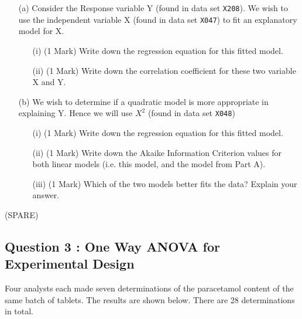 \documentclass[a4paper,12pt]{article}
\begin{document}
\begin{itemize}
	\item[(a)] Consider the Response variable Y (found in data set \texttt{X208}). We wish to use the independent variable X (found in data set \texttt{X047}) to fit an explanatory model for X.
	\begin{itemize}
		\item[(i)] (1 Mark) Write down the regression equation for this fitted model.
		\item[(ii)] (1 Mark) Write down the correlation coefficient for these two variable X and Y. 
	\end{itemize}

	\item[(b)] We wish to determine if a quadratic model is more appropriate in explaining Y. Hence we will use $X^2$ (found in data set \texttt{X048})
	\begin{itemize}
		\item[(i)] (1 Mark) Write down the regression equation for this fitted model.
		\item[(ii)] (1 Mark) Write down the Akaike Information Criterion values for both linear models (i.e. this model, and the model from Part A). 
		\item[(iii)] (1 Mark) Which of the two models better fits the data? Explain your answer. 
		
\end{itemize}
\end{itemize}
\newpage(SPARE)

\newpage 
\subsection*{Question 3 : One Way ANOVA for Experimental Design}
Four analysts each made seven determinations of the paracetamol content of the same batch of tablets.
The results are shown below. There are 28 determinations in total. 


\end{document}
